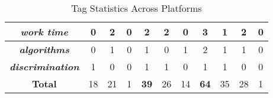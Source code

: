 \begin{table*}[h]
\begin{tabular}{c|ccc|c|cc|c|ccc}
\textit{\textbf{work time}} & \multicolumn{1}{c|}{0} & \multicolumn{1}{c|}{2} & 0 & 2 & \multicolumn{1}{c|}{2} & 0 & 3 & \multicolumn{1}{c|}{1} & \multicolumn{1}{c|}{2} & \multicolumn{1}{c|}{0} \\ \hline
\textit{\textbf{algorithms}} & \multicolumn{1}{c|}{0} & \multicolumn{1}{c|}{1} & 0 & 1 & \multicolumn{1}{c|}{0} & 1 & 2 & \multicolumn{1}{c|}{1} & \multicolumn{1}{c|}{1} & \multicolumn{1}{c|}{0} \\ \hline
\textit{\textbf{discrimination}} & \multicolumn{1}{c|}{1} & \multicolumn{1}{c|}{0} & 0 & 1 & \multicolumn{1}{c|}{1} & 0 & 1 & \multicolumn{1}{c|}{1} & \multicolumn{1}{c|}{0} & \multicolumn{1}{c|}{0} \\ \hline
\textbf{Total} & \multicolumn{1}{c|}{18} & \multicolumn{1}{c|}{21} & 1 & \textbf{39} & \multicolumn{1}{c|}{26} & 14 & \textbf{64} & \multicolumn{1}{c|}{35} & \multicolumn{1}{c|}{28} & 1
\end{tabular}
\caption{Tag Statistics Across Platforms}
\label{tags}
\end{table*}